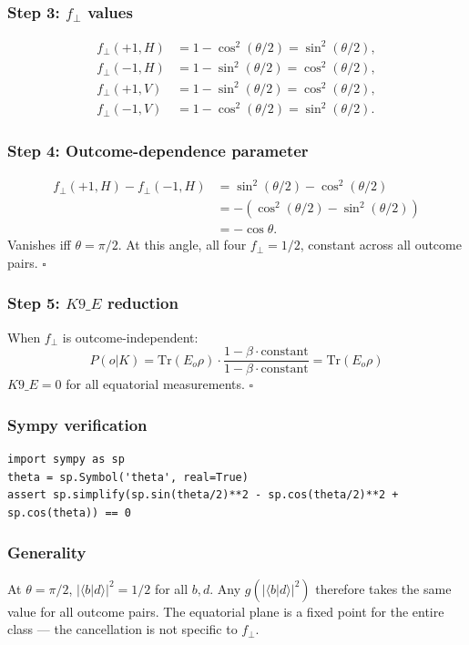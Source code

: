 \documentclass[12pt]{article}
\begin{document}
\subsubsection*{Step 3: $f_\perp$ values}
\begin{align}
f_\perp(+1,H) &= 1 - \cos^2(\theta/2) = \sin^2(\theta/2),\\
f_\perp(-1,H) &= 1 - \sin^2(\theta/2) = \cos^2(\theta/2),\\
f_\perp(+1,V) &= 1 - \sin^2(\theta/2) = \cos^2(\theta/2),\\
f_\perp(-1,V) &= 1 - \cos^2(\theta/2) = \sin^2(\theta/2).
\end{align}

\subsubsection*{Step 4: Outcome-dependence parameter}
\begin{align}
f_\perp(+1, H) - f_\perp(-1, H) &= \sin^2(\theta/2) - \cos^2(\theta/2)\\
&= -( \cos^2(\theta/2) - \sin^2(\theta/2))\\
&= -\cos\theta.
\end{align}
Vanishes iff $\theta = \pi/2$. At this angle, all four $f_\perp = 1/2$, constant across all outcome pairs. $\square$

\subsubsection*{Step 5: $K9\_E$ reduction}
When $f_\perp$ is outcome-independent:
\begin{equation}
P(o|K) = \text{Tr}(E_o \rho) \cdot \frac{1 - \beta \cdot \text{constant}}{1 - \beta \cdot \text{constant}} = \text{Tr}(E_o \rho)
\end{equation}
$K9\_E = 0$ for all equatorial measurements. $\square$

\subsubsection*{Sympy verification}
\begin{verbatim}
import sympy as sp
theta = sp.Symbol('theta', real=True)
assert sp.simplify(sp.sin(theta/2)**2 - sp.cos(theta/2)**2 + sp.cos(theta)) == 0
\end{verbatim}

\subsubsection*{Generality}
At $\theta = \pi/2$, $|\langle b|d\rangle|^2 = 1/2$ for all $b,d$. Any $g(|\langle b|d\rangle|^2)$ therefore takes the same value for all outcome pairs. The equatorial plane is a fixed point for the entire class --- the cancellation is not specific to $f_\perp$.
\end{document}
